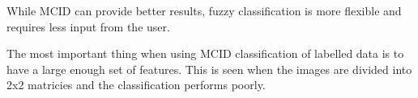 While MCID can provide better results, fuzzy classification is more flexible
and requires less input from the user.

The most important thing when using MCID classification of labelled data is to
have a large enough set of features. This is seen when the images are divided
into 2x2 matricies and the classification performs poorly.